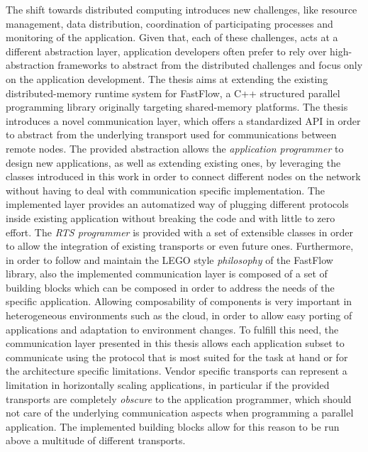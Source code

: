 \documentclass[12pt, oneside]{report}
\begin{document}
The shift towards distributed computing introduces new challenges, like resource management, data distribution, coordination of participating processes and monitoring of the application. Given that, each of these challenges, acts at a different abstraction layer, application developers often prefer to rely over high-abstraction frameworks to abstract from the distributed challenges and focus only on the application development.\newline
{}
The thesis aims at extending the existing distributed-memory runtime system for FastFlow, a C++ structured parallel programming library originally targeting shared-memory platforms. The thesis introduces a novel communication layer, which offers a standardized API in order to abstract from the underlying transport used for communications between remote nodes. The provided abstraction allows the \textit{application programmer} to design new applications, as well as extending existing ones, by leveraging the classes introduced in this work in order to connect different nodes on the network without having to deal with communication specific implementation. The implemented layer provides an automatized way of plugging different protocols inside existing application without breaking the code and with little to zero effort. The \textit{RTS programmer} is provided with a set of extensible classes in order to allow the integration of existing transports or even future ones. Furthermore, in order to follow and maintain the LEGO style \textit{philosophy} of the FastFlow library, also the implemented communication layer is composed of a set of building blocks which can be composed in order to address the needs of the specific application. Allowing composability of components is very important in heterogeneous environments such as the cloud, in order to allow easy porting of applications and adaptation to environment changes. To fulfill this need, the communication layer presented in this thesis allows each application subset to communicate using the protocol that is most suited for the task at hand or for the architecture specific limitations. Vendor specific transports can represent a limitation in horizontally scaling applications, in particular if the provided transports are completely \textit{obscure} to the application programmer, which should not care of the underlying communication aspects when programming a parallel application. The implemented building blocks allow for this reason to be run above a multitude of different transports.\newline\newline
\end{document}
